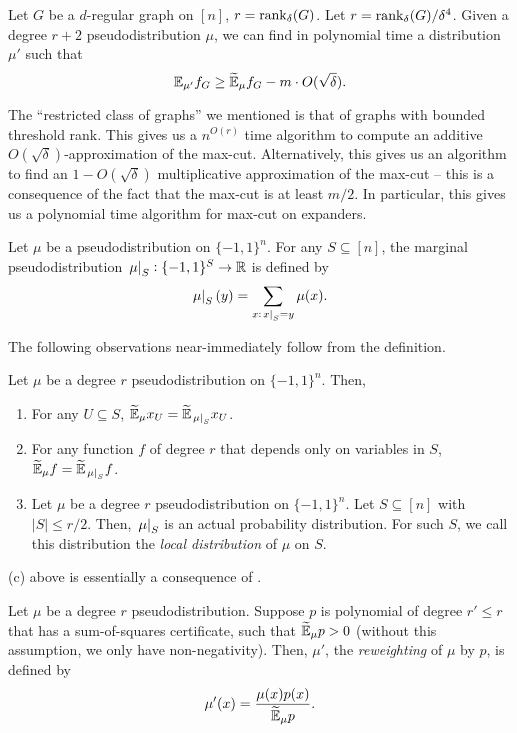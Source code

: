 	\begin{ftheo}
		Let $G$ be a $d$-regular graph on $[n]$, $r = \operatorname{rank}_\delta(G)$. Let $r = \operatorname{rank}_{\delta}(G)/\delta^4$. Given a degree $r+2$ pseudodistribution $\mu$, we can find in polynomial time a distribution $\mu'$ such that
		\[ \mathbb{E}_{\mu'} f_G \ge \widetilde{\mathbb{E}}_{\mu} f_G - m\cdot O(\sqrt{\delta}). \]
	\end{ftheo}
	The ``restricted class of graphs'' we mentioned is that of graphs with bounded threshold rank. This gives us a $n^{O(r)}$ time algorithm to compute an additive $O(\sqrt{\delta})$-approximation of the max-cut. Alternatively, this gives us an algorithm to find an $1-O(\sqrt{\delta})$ multiplicative approximation of the max-cut -- this is a consequence of the fact that the max-cut is at least $m/2$. In particular, this gives us a polynomial time algorithm for max-cut on expanders.

	\begin{fdef}
		Let $\mu$ be a pseudodistribution on $\{-1,1\}^n$. For any $S \subseteq [n]$, the marginal pseudodistribution $\left.\mu\right|_{S} : \{-1,1\}^S \to \mathbb{R}$ is defined by
		\[ \left.\mu\right|_{S}(y) = \sum_{x : \left.x\right|_{S} = y} \mu(x). \]
	\end{fdef}

	The following observations near-immediately follow from the definition.
	\begin{fprop}
		\label{prop:marginal-facts}
		Let $\mu$ be a degree $r$ pseudodistribution on $\{-1,1\}^n$. Then,
		\begin{enumerate}[label=(\alph*)]
			\item For any $U \subseteq S$, $\widetilde{\mathbb{E}}_\mu x_U = \widetilde{\mathbb{E}}_{\left.\mu\right|_{S}} x_U$.
			\item For any function $f$ of degree $r$ that depends only on variables in $S$, $\widetilde{\mathbb{E}}_\mu f = \widetilde{\mathbb{E}}_{\left.\mu\right|_{S}} f$.
			\item Let $\mu$ be a degree $r$ pseudodistribution on $\{-1,1\}^n$. Let $S \subseteq [n]$ with $|S| \le r/2$. Then, $\left.\mu\right|_{S}$ is an actual probability distribution. For such $S$, we call this distribution the \emph{local distribution} of $\mu$ on $S$.
		\end{enumerate}
	\end{fprop}
	(c) above is essentially a consequence of . 

	\begin{fdef}[Reweighting]
		Let $\mu$ be a degree $r$ pseudodistribution. Suppose $p$ is polynomial of degree $r' \le r$ that has a sum-of-squares certificate, such that $\widetilde{\mathbb{E}}_\mu p > 0$ (without this assumption, we only have non-negativity). Then, $\mu'$, the \emph{reweighting} of $\mu$ by $p$, is defined by
		\[ \mu'(x) = \frac{\mu(x) p(x)}{\widetilde{\mathbb{E}}_\mu p}. \]
	\end{fdef}


